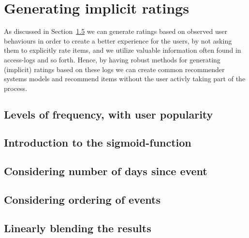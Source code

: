 \section{Generating implicit ratings}

As discussed in Section~\ref{} we can generate ratings based on observed
user behaviours in order to create a better experience for the users, by not
asking them to explicitly rate items, and we utilize valuable information often
found in access-logs and so forth. Hence, by having robust methods for
generating (implicit) ratings based on these logs we can create common
recommender systems models and recommend items without the user activly taking
part of the process.

\subsection{Levels of frequency, with user popularity}

\subsection{Introduction to the sigmoid-function}

\subsection{Considering number of days since event}

\subsection{Considering ordering of events}

\subsection{Linearly blending the results}
